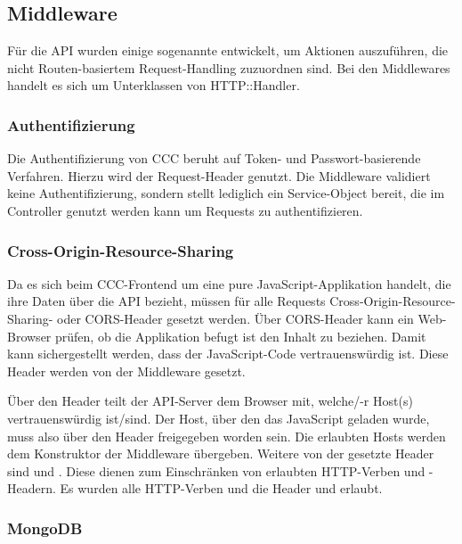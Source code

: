 \subsection{Middleware}
\label{ssec:ba_middleware}

Für die API wurden einige sogenannte  entwickelt, um
Aktionen auszuführen, die nicht Routen-basiertem Request-Handling zuzuordnen
sind.  Bei den Middlewares handelt es sich um Unterklassen von HTTP::Handler.

\subsubsection{Authentifizierung}
\label{sssec:bam_authentifizierung}

Die Authentifizierung von CCC beruht auf Token- und Passwort-basierende
Verfahren.  Hierzu wird der Request-Header  genutzt.  Die
Middleware  validiert keine Authentifizierung, sondern stellt
lediglich ein Service-Object  bereit, die im Controller
genutzt werden kann um Requests zu authentifizieren.

\subsubsection{Cross-Origin-Resource-Sharing}
\label{sssec:bam_cors}

Da es sich beim CCC-Frontend um eine pure JavaScript-Applikation handelt, die
ihre Daten über die API bezieht, müssen für alle Requests
Cross-Origin-Resource-Sharing- oder CORS-Header gesetzt werden. Über
CORS-Header kann ein Web-Browser prüfen, ob die Applikation befugt ist den
Inhalt zu beziehen.  Damit kann sichergestellt werden, dass der JavaScript-Code
vertrauenswürdig ist.  Diese Header werden von der Middleware 
gesetzt.

Über den Header  teilt der API-Server dem
Browser mit, welche/-r Host(s) vertrauenswürdig ist/sind.  Der Host, über den
das JavaScript geladen wurde, muss also über den Header freigegeben worden
sein.  Die erlaubten Hosts werden dem Konstruktor der Middleware übergeben.
Weitere von der gesetzte Header sind  und
.  Diese dienen zum Einschränken von
erlaubten HTTP-Verben und -Headern.  Es wurden alle HTTP-Verben und die Header
 und  erlaubt.

\subsubsection{MongoDB}
\label{sssec:bam_mongodb}

